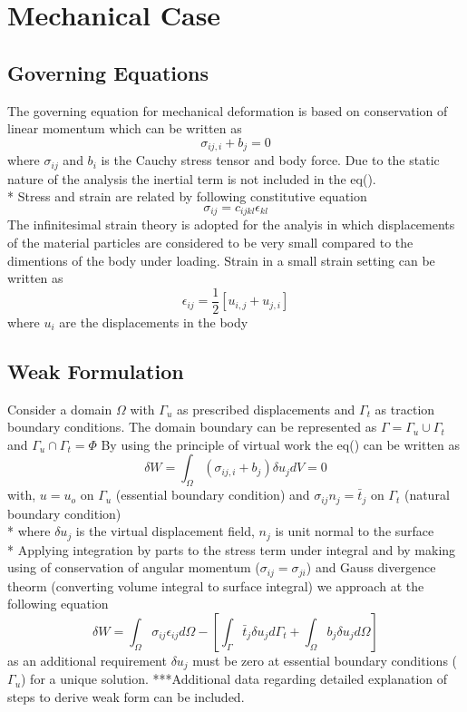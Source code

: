 \documentclass[12pt]{article}
\begin{document}
\section{Mechanical Case}


\subsection{Governing Equations}
The governing equation for mechanical deformation is based on conservation of linear momentum which can be written as
\begin{equation}
\sigma_{ij,i} + b_j = 0
\end{equation}
where $ \sigma_{ij} $ and $ b_i $ is the Cauchy stress tensor and body force. Due to the static nature of the analysis the inertial term is not included in the eq().\\*
Stress and strain are related by following constitutive equation
\begin{equation}
\sigma_{ij} = c_{ijkl} \epsilon_{kl}
\end{equation}
The infinitesimal strain theory is adopted for the analyis in which displacements of the material particles are considered to be very small compared to the dimentions of the body under loading. Strain in a small strain setting can be written as
\begin{equation}
\epsilon_{ij}=\frac{1}{2}[u_{i,j}+u_{j,i}]
\end{equation}
where $ u_{i} $ are the displacements in the body


\subsection{Weak Formulation}
Consider a domain $\Omega$ with $\Gamma_u$ as prescribed displacements and $\Gamma_t$ as traction boundary conditions. The domain boundary can be represented as $\Gamma = \Gamma_u \cup \Gamma_t$ and $\Gamma_u \cap \Gamma_t = \Phi$
By using the principle of virtual work the eq() can be written as
\begin{equation}
\delta W = \int_\Omega (\sigma_{ij,i} + b_j ) \delta u_j dV = 0
\end{equation} 
with,
$u = u_o$ on $\Gamma_u$ (essential boundary condition) and
$\sigma_{ij}n_j = \bar{t}_j$ on $\Gamma_t$ (natural boundary condition) \\*
where $\delta u_j$ is the virtual displacement field, $n_j$ is unit normal to the surface \\*
Applying integration by parts to the stress term under integral and by making using of conservation of angular momentum ($ \sigma_{ij} = \sigma_{ji} $) and Gauss divergence theorm (converting volume integral to surface integral) we approach at the following equation
\begin{equation} \label{FinalWeakform}
\delta W = \int_{\Omega} \sigma_{ij} \epsilon_{ij} d\Omega - \left[ \int_{\Gamma} \bar{t}_j \delta u_j d\Gamma_t  + \int_{\Omega} b_j \delta u_j d\Omega \right]
\end{equation}
as an additional requirement $\delta u_j$ must be zero at essential boundary conditions ($\Gamma_u$) for a unique solution.
***Additional data regarding detailed explanation of steps to derive weak form can be included.
\end{document}
